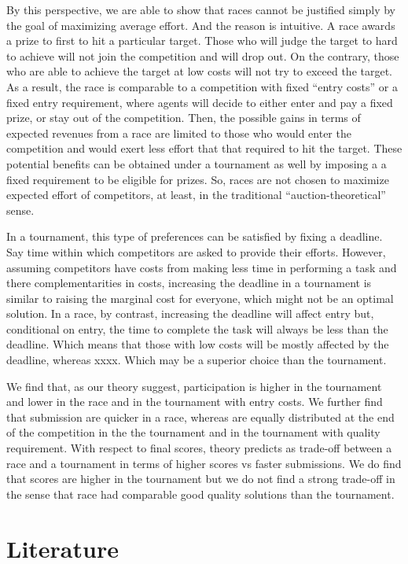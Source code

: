 \documentclass[12pt,]{article}
\begin{document}
By this perspective, we are able to show that races cannot be justified
simply by the goal of maximizing average effort. And the reason is
intuitive. A race awards a prize to first to hit a particular target.
Those who will judge the target to hard to achieve will not join the
competition and will drop out. On the contrary, those who are able to
achieve the target at low costs will not try to exceed the target. As a
result, the race is comparable to a competition with fixed ``entry
costs'' or a fixed entry requirement, where agents will decide to either
enter and pay a fixed prize, or stay out of the competition. Then, the
possible gains in terms of expected revenues from a race are limited to
those who would enter the competition and would exert less effort that
that required to hit the target. These potential benefits can be
obtained under a tournament as well by imposing a a fixed requirement to
be eligible for prizes. So, races are not chosen to maximize expected
effort of competitors, at least, in the traditional
``auction-theoretical'' sense.

In a tournament, this type of preferences can be satisfied by fixing a
deadline. Say time within which competitors are asked to provide their
efforts. However, assuming competitors have costs from making less time
in performing a task and there complementarities in costs, increasing
the deadline in a tournament is similar to raising the marginal cost for
everyone, which might not be an optimal solution. In a race, by
contrast, increasing the deadline will affect entry but, conditional on
entry, the time to complete the task will always be less than the
deadline. Which means that those with low costs will be mostly affected
by the deadline, whereas xxxx. Which may be a superior choice than the
tournament.

We find that, as our theory suggest, participation is higher in the
tournament and lower in the race and in the tournament with entry costs.
We further find that submission are quicker in a race, whereas are
equally distributed at the end of the competition in the the tournament
and in the tournament with quality requirement. With respect to final
scores, theory predicts as trade-off between a race and a tournament in
terms of higher scores vs faster submissions. We do find that scores are
higher in the tournament but we do not find a strong trade-off in the
sense that race had comparable good quality solutions than the
tournament.

\section{Literature}\label{literature}
\end{document}
